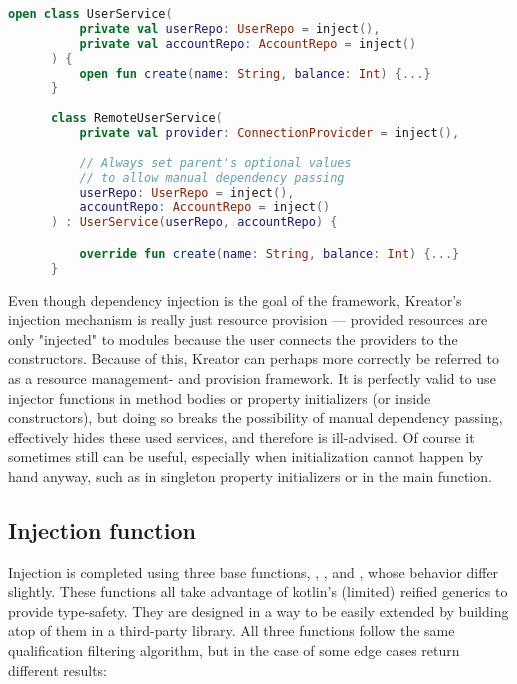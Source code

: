 		\begin{center}
				\begin{minipage}{14cm}
		\begin{lstlisting}[language=Kotlin, title={\emph{Example injections} --- \code{userService.kt}}]
	  open class UserService(
		  private val userRepo: UserRepo = inject(),
		  private val accountRepo: AccountRepo = inject()
	  ) {
		  open fun create(name: String, balance: Int) {...}
	  }
	  
	  class RemoteUserService(
		  private val provider: ConnectionProvicder = inject(),
		  
		  // Always set parent's optional values
		  // to allow manual dependency passing
		  userRepo: UserRepo = inject(),
		  accountRepo: AccountRepo = inject()
	  ) : UserService(userRepo, accountRepo) {

		  override fun create(name: String, balance: Int) {...}
	  }
		\end{lstlisting}
				\end{minipage}
			\end{center}
	
		Even though dependency injection is the goal of the framework, Kreator's injection mechanism is really just resource provision --- provided resources are only "injected" to modules because the user connects the providers to the constructors. Because of this, Kreator can perhaps more correctly be referred to as a resource management- and provision framework. It is perfectly valid to use injector functions in method bodies or property initializers (or inside constructors), but doing so breaks the possibility of manual dependency passing, effectively hides these used services, and therefore is ill-advised. Of course it sometimes still can be useful, especially when initialization cannot happen by hand anyway, such as in singleton property initializers or in the main function.
	
		\subsection*{Injection function}
		
		Injection is completed using three base functions, , , and , whose behavior differ slightly. These functions all take advantage of kotlin's (limited) reified generics to provide type-safety. They are designed in a way to be easily extended by building atop of them in a third-party library. All three functions follow the same qualification filtering algorithm, but in the case of some edge cases return different results:
	
